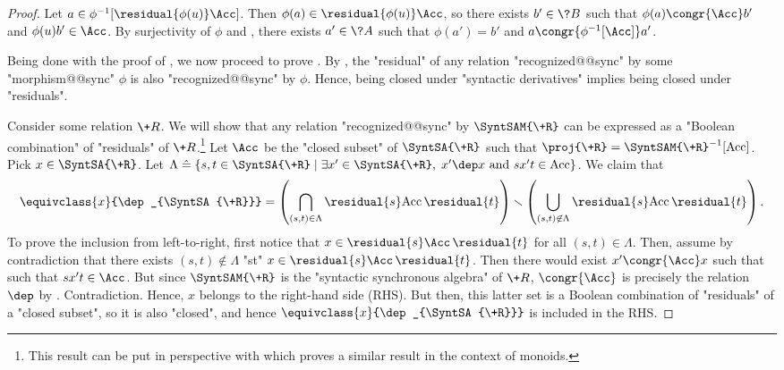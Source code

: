 \begin{proof}
	Let $a \in \phi^{-1}[\residual{\phi(u)}\Acc]$. Then
	$\phi(a) \in \residual{\phi(u)}\Acc$, so there
	exists $b' \in \?B$ such that $\phi(a) \congr{\Acc} b'$
	and $\phi(u)b' \in \Acc$. By surjectivity of $\phi$ and
	, there exists $a' \in \?A$ 
	such that $\phi(a') = b'$ and $a \congr{\phi^{-1}[\Acc]} a'$.

	Being done with the proof of ,
	we now proceed to prove .
	 By ,
	the "residual" of any relation "recognized@@sync" by some "morphism@@sync"
	$\phi$ is also "recognized@@sync" by $\phi$. Hence, being closed under
	"syntactic derivatives" implies being closed under "residuals".

	 Consider some relation $\+R$.
	We will show that any relation "recognized@@sync" by $\SyntSAM{\+R}$
	can be expressed as a "Boolean combination" of "residuals" of $\+R$.\footnote{This result can be 
	put in perspective with \cite[Lemma XIII.4.11, p.~229]{Pin2022MathematicalFoundations} which proves a similar result in the context of monoids.}
	Let $\Acc$ be the "closed subset" of $\SyntSA{\+R}$ such that
	$\proj{\+R} = \SyntSAM{\+R}^{-1}[\Acc]$. Pick $x \in \SyntSA{\+R}$.
	Let $\Lambda \defeq \{s, t \in \SyntSA{\+R} \mid \exists x'\in\SyntSA{\+R},\; x' \dep x \text{ and } sx't \in \Acc\}$.
	We claim that
	\begin{equation}
		\equivclass{x}{\dep_{\SyntSA{\+R}}} =
		\left(
			\bigcap_{(s,t) \in \Lambda} \residual{s} \Acc\,\residual{t}
		\right)
		\smallsetminus
		\left(
			\bigcup_{(s, t) \not\in \Lambda} \residual{s} \Acc\,\residual{t}
		\right).
		\label{eq:boolean-combination-of-residuals}
	\end{equation}
	To prove the inclusion from left-to-right, first
	notice that $x \in \residual{s} \Acc\,\residual{t}$ for all $(s, t) \in \Lambda$.
	Then, assume by contradiction that there exists $(s, t) \not\in \Lambda$ "st"
	$x \in \residual{s} \Acc\,\residual{t}$. Then there would exist $x' \congr{\Acc} x$ such that
	such that $sx't \in \Acc$. But since $\SyntSAM{\+R}$ is the "syntactic synchronous algebra"
	of $\+R$, $\congr{\Acc}$ is precisely the relation $\dep$ by . Contradiction.
	Hence, $x$ belongs to the right-hand side (RHS). But then, this latter set is
	a Boolean combination of "residuals" of a "closed subset", so it is also
	"closed", and hence $\equivclass{x}{\dep_{\SyntSA{\+R}}}$ is included in the RHS.


\end{proof}
